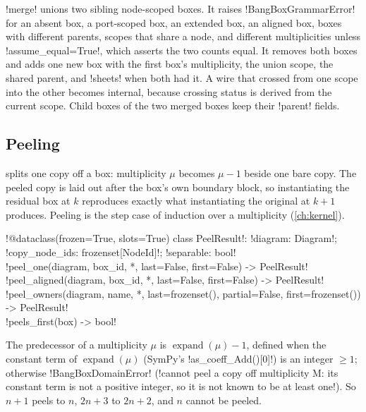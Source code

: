 \py!merge! unions two sibling node-scoped boxes. It raises \py!BangBoxGrammarError! for an absent box, a port-scoped box, an extended box, an aligned box, boxes with different parents, scopes that share a node, and different multiplicities unless \py!assume_equal=True!, which asserts the two counts equal. It removes both boxes and adds one new box with the first box's multiplicity, the union scope, the shared parent, and \py!sheets! when both had it. A wire that crossed from one scope into the other becomes internal, because crossing status is derived from the current scope. Child boxes of the two merged boxes keep their \py!parent! fields.

\subsection{Peeling}

 splits one copy off a box: multiplicity $\mu$ becomes $\mu-1$ beside one bare copy. The peeled copy is laid out after the box's own boundary block, so instantiating the residual box at $k$ reproduces exactly what instantiating the original at $k+1$ produces. Peeling is the step case of induction over a multiplicity (\cref{ch:kernel}).

\begin{signature}
\py!@dataclass(frozen=True, slots=True) class PeelResult!: \py!diagram: Diagram!; \py!copy_node_ids: frozenset[NodeId]!; \py!separable: bool!\\
\py!peel_one(diagram, box_id, *, last=False, first=False) -> PeelResult!\\
\py!peel_aligned(diagram, box_id, *, last=False, first=False) -> PeelResult!\\
\py!peel_owners(diagram, name, *, last=frozenset(), partial=False, first=frozenset()) -> PeelResult!\\
\py!peels_first(box) -> bool!
\end{signature}

\begin{definition}[Predecessor]\label{def:diagrams-predecessor}
The predecessor of a multiplicity $\mu$ is $\operatorname{expand}(\mu)-1$, defined when the constant term of $\operatorname{expand}(\mu)$ (SymPy's \py!as_coeff_Add()[0]!) is an integer $\ge 1$; otherwise \py!BangBoxDomainError! (\code!cannot peel a copy off multiplicity M: its constant term is not a positive integer, so it is not known to be at least one!). So $n+1$ peels to $n$, $2n+3$ to $2n+2$, and $n$ cannot be peeled.
\end{definition}

